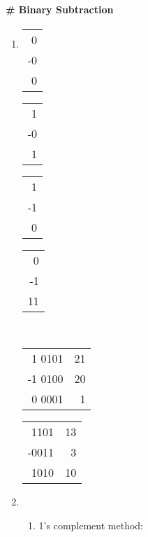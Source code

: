 \documentclass[../main-sheet.tex]{subfiles}
\begin{document}
\paragraph{\# Binary Subtraction}
\begin{enumerate}
    \item \begin{tabular}{r}
              0  \\
              -0 \\\hline
              0
          \end{tabular} \qquad \begin{tabular}{r}
              1  \\
              -0 \\\hline
              1
          \end{tabular} \qquad \begin{tabular}{r}
              1  \\
              -1 \\\hline
              0
          \end{tabular} \qquad \begin{tabular}{r}
              0  \\
              -1 \\\hline
              11
          \end{tabular}\\
          \begin{tabular}{r|r}
              1 0101  & 21 \\
              -1 0100 & 20 \\\hline
              0 0001  & 1
          \end{tabular} \qquad\qquad\begin{tabular}{r|r}
              1101  & 13 \\
              -0011 & 3  \\\hline
              1010  & 10
          \end{tabular}
    \item \begin{enumerate}[label=(\roman*)]
              \item 1's complement method:


\end{enumerate}
\end{enumerate}
\end{document}
